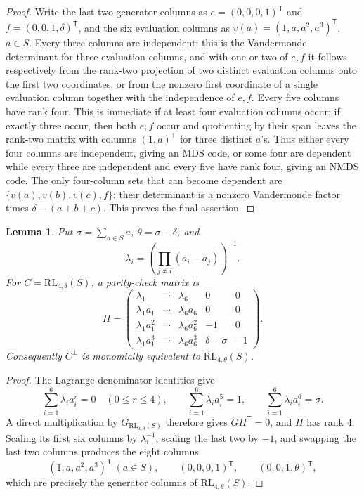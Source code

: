 ﻿\documentclass[11pt]{article}
\newcommand{\RL}{\mathrm{RL}}
\theoremstyle{plain}
\newtheorem{lemma}[theorem]{Lemma}
\theoremstyle{definition}
\begin{document}
\begin{proof}
Write the last two generator columns as
\(e=(0,0,0,1)^{\mathsf T}\) and
\(f=(0,0,1,\delta)^{\mathsf T}\), and the six evaluation columns as
\(v(a)=(1,a,a^2,a^3)^{\mathsf T}\), \(a\in S\).  Every three columns are
independent: this is the Vandermonde determinant for three evaluation
columns, and with one or two of \(e,f\) it follows respectively from the
rank-two projection of two distinct evaluation columns onto the first two
coordinates, or from the nonzero first coordinate of a single evaluation column together
with the independence of \(e,f\).  Every
five columns have rank four.  This is immediate if at least four evaluation
columns occur; if exactly three occur, then both \(e,f\) occur and quotienting
by their span leaves the rank-two matrix with columns \((1,a)^{\mathsf T}\)
for three distinct \(a\)'s.  Thus either every four columns are independent,
giving an MDS code, or some four are dependent while every three are
independent and every five have rank four, giving an NMDS code.
The only four-column sets that can become dependent are
\(\{v(a),v(b),v(c),f\}\): their determinant is a nonzero Vandermonde
factor times \(\delta-(a+b+c)\).  This proves the final assertion.
\end{proof}

\begin{lemma}\label{lem:duality}
Put \(\sigma=\sum_{a\in S}a\), \(\theta=\sigma-\delta\), and
\[
  \lambda_i=\left(\prod_{j\ne i}(a_i-a_j)\right)^{-1}.
\]
For \(C=\RL_{4,\delta}(S)\), a parity-check matrix is
\[
H=
\begin{pmatrix}
\lambda_1&\cdots&\lambda_6&0&0\\
\lambda_1a_1&\cdots&\lambda_6a_6&0&0\\
\lambda_1a_1^2&\cdots&\lambda_6a_6^2&-1&0\\
\lambda_1a_1^3&\cdots&\lambda_6a_6^3&\delta-\sigma&-1
\end{pmatrix}.
\]
Consequently \(C^\perp\) is monomially equivalent to
\(\RL_{4,\theta}(S)\).
\end{lemma}

\begin{proof}
The Lagrange denominator identities give
\[
 \sum_{i=1}^6\lambda_i a_i^r=0\quad(0\le r\le4),
 \qquad
 \sum_{i=1}^6\lambda_i a_i^5=1,
 \qquad
 \sum_{i=1}^6\lambda_i a_i^6=\sigma.
\]
A direct multiplication by \(G_{\RL_{4,\delta}(S)}\) therefore gives
\(GH^{\mathsf T}=0\), and \(H\) has rank \(4\).  Scaling its first six
columns by \(\lambda_i^{-1}\), scaling the last two by \(-1\), and swapping
the last two columns produces the eight columns
\[
 (1,a,a^2,a^3)^{\mathsf T}\ (a\in S),\qquad
 (0,0,0,1)^{\mathsf T},\qquad(0,0,1,\theta)^{\mathsf T},
\]
which are precisely the generator columns of \(\RL_{4,\theta}(S)\).
\end{proof}
\end{document}
